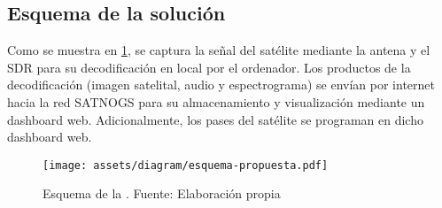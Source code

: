 {\subsection{Esquema de la solución}}

Como se muestra en \ref{fig:esquema-propuesta}, se captura la señal del satélite mediante la antena y el SDR para su decodificación en local por el ordenador. Los productos de la decodificación (imagen satelital, audio y espectrograma) se envían por internet hacia la red SATNOGS para su almacenamiento y visualización mediante un dashboard web. Adicionalmente, los pases del satélite se programan en dicho dashboard web.

\begin{figure}[H]
    \centering
    \texttt{[image: assets/diagram/esquema-propuesta.pdf]}
    \caption{Esquema de la . Fuente: Elaboración propia}
    \label{fig:esquema-propuesta}
\end{figure}